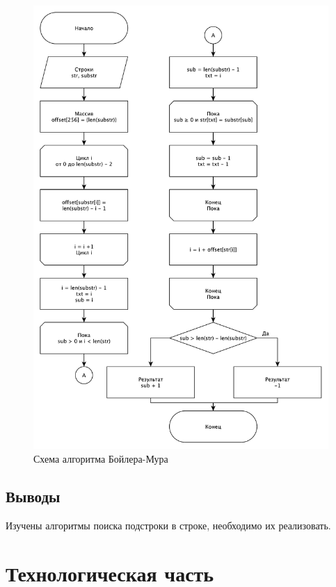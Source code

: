 \documentclass[a4paper,12pt]{article}
\begin{document}
\begin{figure}[H]
    \centering
    \includegraphics[scale=0.6]{boiler_myr}
    \caption{Схема алгоритма Бойлера-Мура}
    \label{img:bm}
\end{figure}

\subsection{Выводы}

Изучены алгоритмы поиска подстроки в строке, необходимо их реализовать.

\newpage
\section{Технологическая часть}
\end{document}
